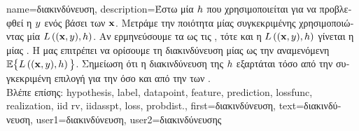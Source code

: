 {name={\foreignlanguage{greek}{διακινδύνευση}},
	description={\foreignlanguage{greek}{Έστω μία}  $h$ 
		\foreignlanguage{greek}{που χρησιμοποιείται για να προβλεφθεί η}  
		$y$ \foreignlanguage{greek}{ενός}  \foreignlanguage{greek}{βάσει των}  ${\bf x}$. 
		\foreignlanguage{greek}{Μετράμε την ποιότητα μίας συγκεκριμένης}  
		 \foreignlanguage{greek}{χρησιμοποιώντας μία}  $L\left(({\bf x},y),h \right)$. 
		\foreignlanguage{greek}{Αν ερμηνεύσουμε τα}  \foreignlanguage{greek}{ως τις}  
		 , \foreignlanguage{greek}{τότε και η 
		$L\left(({\bf x},y),h \right)$ γίνεται η}  
		\foreignlanguage{greek}{μίας} . \foreignlanguage{greek}{Η}  \foreignlanguage{greek}{μας επιτρέπει 
		να ορίσουμε τη διακινδύνευση μίας}  
		\foreignlanguage{greek}{ως την αναμενόμενη}  $\mathbb{E} \big\{L\left(({\bf x},y),h \right) \big\}$. 
		\foreignlanguage{greek}{Σημείωση ότι η διακινδύνευση της $h$ εξαρτάται τόσο από την συγκεκριμένη επιλογή 
		για την}  \foreignlanguage{greek}{όσο και από την}  
		\foreignlanguage{greek}{των} .\\
		\foreignlanguage{greek}{Βλέπε επίσης:} \gls{hypothesis}, \gls{label}, \gls{datapoint}, \gls{feature}, \gls{prediction}, \gls{lossfunc}, \gls{realization}, \gls{iid} \gls{rv}, \gls{iidasspt}, \gls{loss}, \gls{probdist}.},
	first={\foreignlanguage{greek}{διακινδύνευση}},
	text={\foreignlanguage{greek}{διακινδύνευση}},
	user1={\foreignlanguage{greek}{διακινδύνευση}}, %
    	user2={\foreignlanguage{greek}{διακινδύνευσης}} %
}


